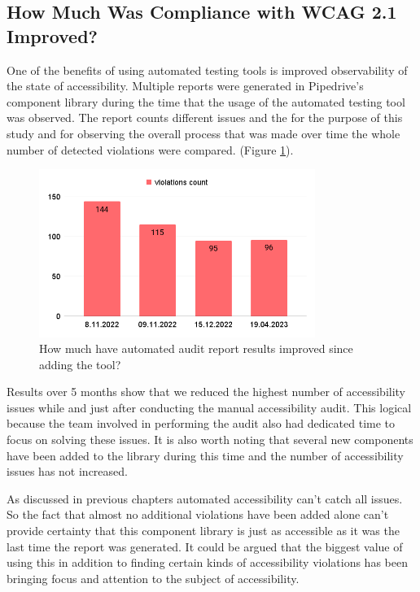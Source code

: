 \documentclass{master_thesis}
\begin{document}
\subsection{How Much Was Compliance with WCAG 2.1 Improved?}


One of the benefits of using automated testing tools is improved observability of the state of accessibility.
Multiple reports were generated in Pipedrive's component library during the time that the usage of the automated testing tool was observed. The report counts different issues and the for the purpose of this study and for observing the overall process that was made over time the whole number of detected violations were compared. (Figure \ref{fig:automted-reports}).

\begin{figure}[ht]
	\centering
	\includegraphics[width=0.8\textwidth]{img/automated-audit-reports.png}
	\caption{How much have automated audit report results improved since adding the tool?}
	\label{fig:automted-reports}
\end{figure}

Results over 5 months show that we reduced the highest number of accessibility issues while and just after conducting the manual accessibility audit. This logical because the team involved in performing the audit also had dedicated time to focus on solving these issues. It is also worth noting that several new components have been added to the library during this time and the number of accessibility issues has not increased.

As discussed in previous chapters automated accessibility can't catch all issues. So the fact that almost no additional violations have been added alone can't provide certainty that this component library is just as accessible as it was the last time the report was generated. It could be argued that the biggest value of using this in addition to finding certain kinds of accessibility violations has been bringing focus and attention to the subject of accessibility.
\end{document}
